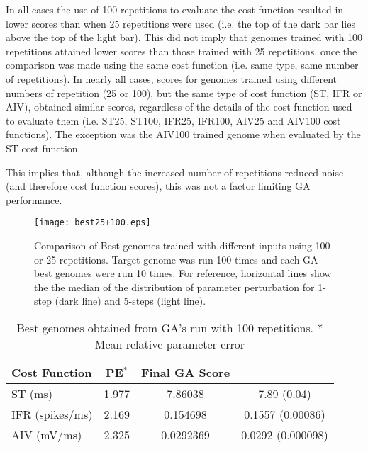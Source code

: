 \medskip{}

In all cases the use of 100 repetitions to evaluate the cost function
resulted in lower scores than when 25 repetitions were used (i.e. the
top of the dark bar lies above the top of the light bar). This did not
imply that genomes trained with 100 repetitions attained lower scores
than those trained with 25 repetitions, once the comparison was made
using the same cost function (i.e. same type, same number of
repetitions). In nearly all cases, scores for genomes trained using
different numbers of repetition (25 or 100), but the same type of cost
function (ST, IFR or AIV), obtained similar scores, regardless of the
details of the cost function used to evaluate them (i.e. ST25, ST100,
IFR25, IFR100, AIV25 and AIV100 cost functions). The exception was the
AIV100 trained genome when evaluated by the ST cost
function. %

\medskip{}

This implies that, although the increased number of repetitions
reduced noise (and therefore cost function scores), this was not a
factor limiting GA performance.

\begin{figure}[tb!]
  \centering
  \texttt{[image: best25+100.eps]}
  \caption{Comparison of Best genomes trained with different inputs
    using 100 or 25 repetitions.  Target genome was run 100 times and
    each GA best genomes were run 10 times. For reference, horizontal
    lines show the the median of the distribution of parameter
    perturbation for 1-step (dark line) and 5-steps (light
    line).}\label{fig:R7}
\end{figure}


\begin{table}[tb]
  \centering
  \begin{tabularx}{0.95\textwidth}{X|c|c|c}
    Cost Function &  PE$^*$ & Final GA Score & \\[0.5ex]\hline
    ST (ms)    & 1.977 &     7.86038    &  7.89 (0.04) \\
    IFR (spikes/ms)& 2.169 &    0.154698    & 0.1557 (0.00086) \\
    AIV (mV/ms)  & 2.325 &   0.0292369    & 0.0292 (0.000098)\\ \hline
  \end{tabularx}
  \caption{Best genomes obtained from GA's run with 100 repetitions. $*$ Mean relative parameter error }
  \label{tab:BestGenome100}
\end{table}

